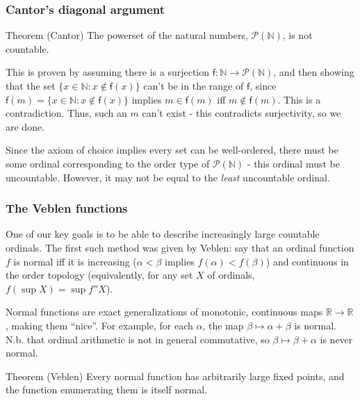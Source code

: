 \documentclass{beamer}
\begin{document}
\begin{frame}
\frametitle{Cantor's diagonal argument}
\begin{block}{Theorem (Cantor)}
The powerset of the natural numbers, $\mathcal{P}(\mathbb{N})$, is not countable.
\end{block}

\pause

This is proven by assuming there is a surjection $\mathsf{f}: \mathbb{N} \to \mathcal{P}(\mathbb{N})$, and then showing that the set $\{x \in \mathbb{N}: x \notin \mathsf{f}(x)\}$ can't be in the range of $\mathsf{f}$, since $\mathsf{f}(m) = \{x \in \mathbb{N}: x \notin \mathsf{f}(x)\}$ implies $m \in \mathsf{f}(m)$ iff $m \notin \mathsf{f}(m)$. This is a contradiction. \pause Thus, such an $m$ can't exist - this contradicts surjectivity, so we are done.

Since the axiom of choice implies every set can be well-ordered, there must be some ordinal corresponding to the order type of $\mathcal{P}(\mathbb{N})$ - this ordinal must be uncountable. However, it may not be equal to the \textit{least} uncountable ordinal.
\end{frame}

\begin{frame}
\frametitle{The Veblen functions}
One of our key goals is to be able to describe increasingly large countable ordinals. The first such method was given by Veblen: say that an ordinal function $f$ is \alert{normal} iff it is increasing ($\alpha < \beta$ implies $f(\alpha) < f(\beta)$) and continuous in the order topology (equivalently, for any set $X$ of ordinals, $f(\sup X) = \sup f''X$).

\pause

Normal functions are exact generalizations of monotonic, continuous maps $\mathbb{R} \to \mathbb{R}$, making them ``nice''. For example, for each $\alpha$, the map $\beta \mapsto \alpha+\beta$ is normal. N.b. that ordinal arithmetic is not in general commutative, so $\beta \mapsto \beta+\alpha$ is never normal.

\pause

\begin{block}{Theorem (Veblen)}
Every normal function has arbitrarily large fixed points, and the function enumerating them is itself normal.
\end{block}
\end{frame}
\end{document}
